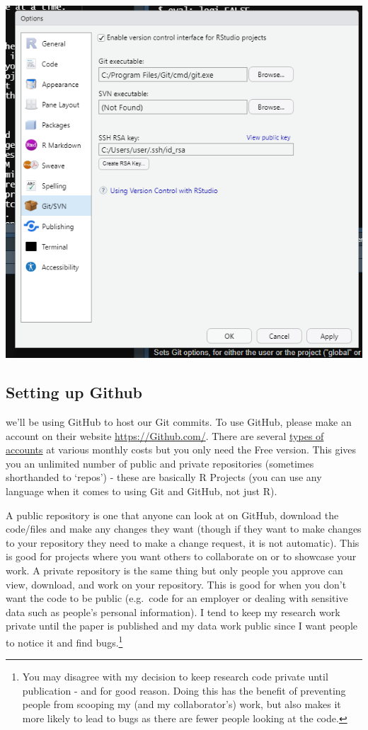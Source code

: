 \documentclass[
  12pt,
]{book}
\begin{document}
\includegraphics{images/git_tools.PNG}

\hypertarget{setting-up-github}{%
\subsection{Setting up Github}\label{setting-up-github}}

we'll be using GitHub to host our Git commits. To use GitHub, please make an account on their website \url{https://Github.com/}. There are several \href{https://Github.com/pricing}{types of accounts} at various monthly costs but you only need the Free version. This gives you an unlimited number of public and private repositories (sometimes shorthanded to `repos') - these are basically R Projects (you can use any language when it comes to using Git and GitHub, not just R).

A public repository is one that anyone can look at on GitHub, download the code/files and make any changes they want (though if they want to make changes to your repository they need to make a change request, it is not automatic). This is good for projects where you want others to collaborate on or to showcase your work. A private repository is the same thing but only people you approve can view, download, and work on your repository. This is good for when you don't want the code to be public (e.g.~code for an employer or dealing with sensitive data such as people's personal information). I tend to keep my research work private until the paper is published and my data work public since I want people to notice it and find bugs.\footnote{You may disagree with my decision to keep research code private until publication - and for good reason. Doing this has the benefit of preventing people from scooping my (and my collaborator's) work, but also makes it more likely to lead to bugs as there are fewer people looking at the code.}
\end{document}

